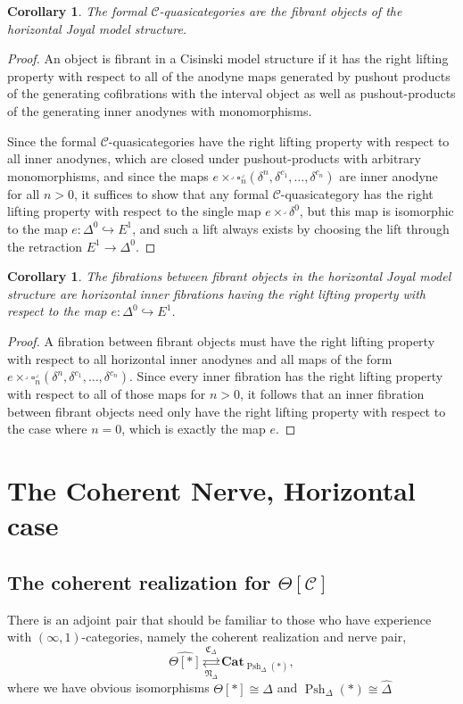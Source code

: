 \documentclass[leqno]{article}
\numberwithin{equation}{subsection}
\theoremstyle{plain}   %
\newtheorem{cor}[equation]{Corollary}
\theoremstyle{remark}
\theoremstyle{plain}
\DeclareMathOperator{\Psh}{Psh}
\newcommand{\Cat}{\ensuremath{\mathbf{Cat}}}
\newcommand{\psh}[1]{\ensuremath{\widehat{#1}}}
\providecommand{\C}{}
\renewcommand{\C}{\ensuremath{\mathcal{C}}}
\begin{document}
\begin{cor}
	The formal \(\C\)-quasicategories are the fibrant objects of the horizontal Joyal model structure.
\end{cor}
\begin{proof}
	An object is fibrant in a Cisinski model structure if it has the right lifting property with respect to all of the anodyne maps generated by pushout products of the generating cofibrations with the interval object as well as pushout-products of the generating inner anodynes with monomorphisms.  
	
	Since the formal \(\C\)-quasicategories have the right lifting property with respect to all inner anodynes, which are closed under pushout-products with arbitrary monomorphisms, and since the maps \(e\times^\lrcorner  \square_n^\lrcorner(\delta^n,\delta^{c_1},\dots,\delta^{c_n})\) are inner anodyne for all \(n>0\),  it suffices to show that any formal \(\C\)-quasicategory has the right lifting property with respect to the single map \(e\times^\lrcorner \delta^0\), but this map is isomorphic to the map \(e:\Delta^0 \hookrightarrow E^1\), and such a lift always exists by choosing the lift through the retraction \(E^1\to \Delta^0\).
\end{proof}
\begin{cor}
	The fibrations between fibrant objects in the horizontal Joyal model structure are horizontal inner fibrations having the right lifting property with respect to the map \(e:\Delta^0\hookrightarrow E^1\).
\end{cor}
\begin{proof} 
	A fibration between fibrant objects must have the right lifting property with respect to all horizontal inner anodynes and all maps of the form \(e\times^\lrcorner  \square_n^\lrcorner(\delta^n,\delta^{c_1},\dots,\delta^{c_n})\).  Since every inner fibration has the right lifting property with respect to all of those maps for \(n>0\), it follows that an inner fibration between fibrant objects need only have the right lifting property with respect to the case where \(n=0\), which is exactly the map \(e\).
\end{proof}


\section{The Coherent Nerve, Horizontal case}
\subsection{The coherent realization for \(\Theta[\C]\)}
There is an adjoint pair that should be familiar to those who have experience with \((\infty,1)\)-categories, namely the coherent realization and nerve pair, \[\psh{\Theta[\ast]}  \underset{\mathfrak{N}_\Delta}{\overset{\mathfrak{C}_\Delta}{\rightleftarrows}} \Cat_{\Psh_\Delta(\ast)},\] where we have obvious isomorphisms \(\Theta[\ast]\cong \Delta\) and \(\Psh_\Delta(\ast)\cong \psh{\Delta}\)
\end{document}
